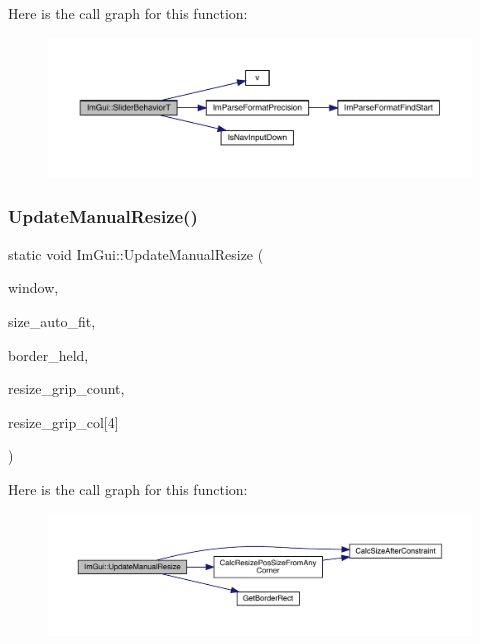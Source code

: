 Here is the call graph for this function\+:
\nopagebreak
\begin{figure}[H]
\begin{center}
\leavevmode
\includegraphics[width=350pt]{df/d13/namespace_im_gui_addfe850a41dd51c7d0d7ac06742133db_cgraph}
\end{center}
\end{figure}
\mbox{\label{namespace_im_gui_a47e299647fc918d97e3085272493bd13}} 
\subsubsection{\texorpdfstring{Update\+Manual\+Resize()}{UpdateManualResize()}}
{\footnotesize\ttfamily static void Im\+Gui\+::\+Update\+Manual\+Resize (\begin{DoxyParamCaption}\item[{Im\+Gui\+Window $\ast$}]{window,  }\item[{const Im\+Vec2 \&}]{size\+\_\+auto\+\_\+fit,  }\item[{int $\ast$}]{border\+\_\+held,  }\item[{int}]{resize\+\_\+grip\+\_\+count,  }\item[{Im\+U32}]{resize\+\_\+grip\+\_\+col\mbox{[}4\mbox{]} }\end{DoxyParamCaption})\hspace{0.3cm}{\ttfamily [static]}}

Here is the call graph for this function\+:
\nopagebreak
\begin{figure}[H]
\begin{center}
\leavevmode
\includegraphics[width=350pt]{df/d13/namespace_im_gui_a47e299647fc918d97e3085272493bd13_cgraph}
\end{center}
\end{figure}
\mbox{\label{namespace_im_gui_accb45e7a4174fdc2e0d2b662c834759d}} 
